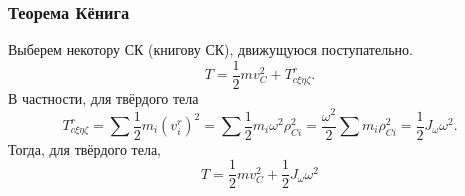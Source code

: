 \subsubsection*{Теорема Кёнига}
Выберем некотору СК (книгову СК), движущуюся поступательно.
$$
    T = \frac{1}{2} m v_C^2 + T_{c \xi \eta \zeta}^r.
$$
В частности, для твёрдого тела
$$
    T_{c \xi \eta \zeta}^r = \sum \frac{1}{2} m_i (v_i^r)^2 = 
    \sum \frac{1}{2} m_i \omega^2 \rho_{Ci}^2 = \frac{\omega^2}{2} \sum m_i \rho^2_{Ci} = \frac{1}{2} J_\omega \omega^2.
$$
Тогда, для твёрдого тела,
$$
    T = \frac{1}{2} m v_C^2 + \frac{1}{2} J_\omega \omega^2
$$